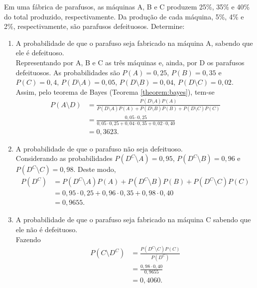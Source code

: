 \begin{pageWidthArea}
	\begin{example}
			Em uma fábrica de parafusos, as máquinas A, B e C produzem 25\%, 35\% e 40\% do total produzido, respectivamente. Da produção de cada máquina, 5\%, 4\% e 2\%, respectivamente, são parafusos defeituosos. Determine:\\
	
			\begin{enumerate}[label=\alph*), itemsep=10pt]
				\item A probabilidade de que o parafuso seja fabricado na máquina A, sabendo que ele é defeituoso.\\
				
				Representando por A, B e C as três máquinas e, ainda, por D os parafusos defeituosos. As probabilidades são $P(A)=0,25$, $P(B)=0,35$ e $P(C)=0,4$, $P(D\setminus A)=0,05$, $P(D\setminus B)=0,04$, $P(D\setminus C)=0,02$. Assim, pelo teorema de Bayes (Teorema \ref{theorem:bayes}), tem-se
				\begin{align*}
					P(A\setminus D) &=
					\frac{
						P(D\setminus A)P(A)
					}{
						P(D\setminus A)P(A)+P(D\setminus B)P(B)+P(D\setminus C)P(C)
					}\\
					&=\frac{0,05\cdot 0,25}{
						0,05\cdot 0,25
						+
						0,04\cdot 0,35
						+
						0,02\cdot 0,40
					}\\
					&=0,3623\text{.}
				\end{align*}
				
				\item A probabilidade de que o parafuso não seja defeituoso.\\
				
				Considerando as probabilidades $P(D^C\setminus A)=0,95$, $P(D^C\setminus B)=0,96$ e $P(D^C\setminus C)=0,98$. Deste modo,
				\begin{align*}
					P(D^C) &= P(D^C\setminus A)P(A)+P(D^C\setminus B)P(B)+P(D^C\setminus C)P(C)\\
					&=0,95\cdot 0,25+0,96\cdot 0,35+0,98\cdot 0,40\\
					&=0,9655\text{.}
				\end{align*}
				
				\item A probabilidade de que o parafuso seja fabricado na máquina C sabendo que ele não é defeituoso.\\
				
				Fazendo
				\begin{align*}
					P(C\setminus D^C)&=\frac{P(D^C\setminus C)P(C)}{P(D^C)}\\
					&=\frac{0,98\cdot 0,40}{0,9655}\\
					&=0,4060\text{.}
				\end{align*}
			\end{enumerate}
	\end{example}
\end{pageWidthArea}